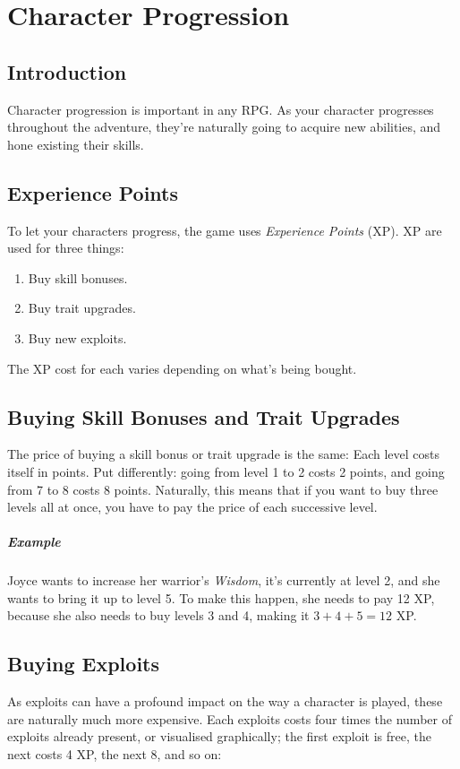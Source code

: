 \chapter{Character Progression}\label{chap:char-prog}
\section{Introduction}
Character progression is important in any RPG.
As your character progresses throughout the adventure, they're naturally going to acquire new abilities, and hone existing their skills.

\section{Experience Points}
To let your characters progress, the game uses \textit{Experience Points} (XP).
XP are used for three things:
\begin{enumerate}
\item Buy skill bonuses.
\item Buy trait upgrades.
\item Buy new exploits.
\end{enumerate}
The XP cost for each varies depending on what's being bought.

\section{Buying Skill Bonuses and Trait Upgrades}
The price of buying a skill bonus or trait upgrade is the same:
Each level costs itself in points.
Put differently: going from level 1 to 2 costs 2 points, and going from 7 to 8 costs 8 points.
Naturally, this means that if you want to buy three levels all at once, you have to pay the price of each successive level.

\paragraph{Example} Joyce wants to increase her warrior's \textit{Wisdom}, it's currently at level 2, and she wants to bring it up to level 5.
To make this happen, she needs to pay 12 XP, because she also needs to buy levels 3 and 4, making it $3 + 4 + 5 = 12$ XP.

\section{Buying Exploits}
As exploits can have a profound impact on the way a character is played, these are naturally much more expensive.
Each exploits costs four times the number of exploits already present, or visualised graphically; the first exploit is free, the next costs 4 XP, the next 8, and so on:

